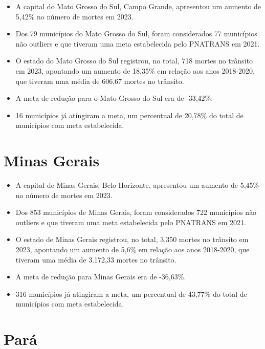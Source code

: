 \documentclass[
  letterpaper,
  DIV=11,
  numbers=noendperiod]{scrreprt}
\begin{document}
\begin{itemize}
\item
  A capital do Mato Grosso do Sul, Campo Grande, apresentou um aumento
  de 5,42\% no número de mortes em 2023.
\item
  Dos 79 municípios do Mato Grosso do Sul, foram considerados 77
  municípios não outliers e que tiveram uma meta estabelecida pelo
  PNATRANS em 2021.
\item
  O estado do Mato Grosso do Sul registrou, no total, 718 mortes no
  trânsito em 2023, apontando um aumento de 18,35\% em relação aos anos
  2018-2020, que tiveram uma média de 606,67 mortes no trânsito.
\item
  A meta de redução para o Mato Grosso do Sul era de -33,42\%.
\item
  16 municípios já atingiram a meta, um percentual de 20,78\% do total
  de municípios com meta estabelecida.
\end{itemize}

\section{Minas Gerais}\label{minas-gerais}

\begin{itemize}
\item
  A capital de Minas Gerais, Belo Horizonte, apresentou um aumento de
  5,45\% no número de mortes em 2023.
\item
  Dos 853 municípios de Minas Gerais, foram considerados 722 municípios
  não outliers e que tiveram uma meta estabelecida pelo PNATRANS em
  2021.
\item
  O estado de Minas Gerais registrou, no total, 3.350 mortes no trânsito
  em 2023, apontando um aumento de 5,6\% em relação aos anos 2018-2020,
  que tiveram uma média de 3.172,33 mortes no trânsito.
\item
  A meta de redução para Minas Gerais era de -36,63\%.
\item
  316 municípios já atingiram a meta, um percentual de 43,77\% do total
  de municípios com meta estabelecida.
\end{itemize}

\section{Pará}\label{paruxe1}
\end{document}
